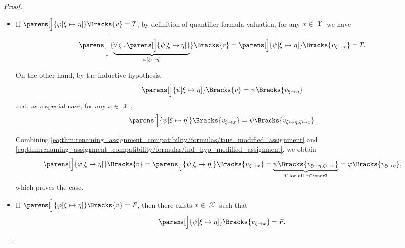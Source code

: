 \begin{proof}
\begin{itemize}
\begin{itemize}
      \begin{itemize}
        \item If \( \parens[\Big]{\varphi[\xi \mapsto \eta]}\Bracks{v} = T \), by definition of \hyperref[def:first_order_valuation/formula_valuation]{quantifier formula valuation}, for any \( x \in \mscrX \) we have
        \begin{equation}\label{eq:thm:renaming_assignment_compatibility/formulas/true_modified_assignment}
          \parens[\Bigg]{\underbrace{\qforall \zeta \parens[\Big]{ \psi[\xi \mapsto \eta] }}_{\varphi[\xi \mapsto \eta]} }\Bracks{v}
          =
          \parens[\Big]{\psi[\xi \mapsto \eta]}\Bracks{v_{\zeta \mapsto x}}
          =
          T.
        \end{equation}

        On the other hand, by the inductive hypothesis,
        \begin{equation*}
          \parens[\Big]{ \psi[\xi \mapsto \eta] }\Bracks{v} = \psi\Bracks{v_{\xi \mapsto \eta}}
        \end{equation*}
        and, as a special case, for any \( x \in \mscrX \),
        \begin{equation}\label{eq:thm:renaming_assignment_compatibility/formulas/ind_hyp_modified_assignment}
          \parens[\Big]{ \psi[\xi \mapsto \eta] }\Bracks{v_{\zeta \mapsto x}} = \psi\Bracks{v_{\xi \mapsto \eta, \zeta \mapsto x}}.
        \end{equation}

        Combining \eqref{eq:thm:renaming_assignment_compatibility/formulas/true_modified_assignment} and \eqref{eq:thm:renaming_assignment_compatibility/formulas/ind_hyp_modified_assignment}, we obtain
        \begin{equation*}
          \parens[\Big]{ \varphi[\xi \mapsto \eta] }\Bracks{v}
          =
          \parens[\Big]{ \psi[\xi \mapsto \eta] }\Bracks{v_{\zeta \mapsto x}}
          =
          \underbrace{\psi\Bracks{v_{\xi \mapsto \eta, \zeta \mapsto x}}}_{T \T{for all} x \in \mscrX}
          =
          \varphi\Bracks{v_{\xi \mapsto \eta}},
        \end{equation*}
        which proves the case.

        \item If \( \parens[\Big]{\varphi[\xi \mapsto \eta]}\Bracks{v} = F \), then there exists \( x \in \mscrX \) such that
        \begin{equation*}
          \parens[\Big]{\psi[\xi \mapsto \eta]}\Bracks{v_{\zeta \mapsto x}} = F.
        \end{equation*}


\end{itemize}
\end{itemize}
\end{itemize}
\end{proof}
